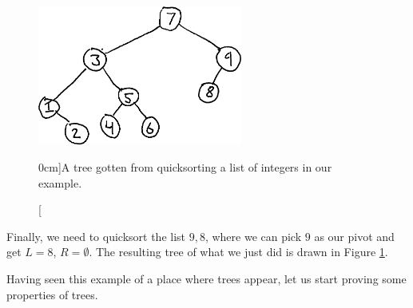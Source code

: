\documentclass[nobib]{tufte-handout}
\begin{document}
\begin{example}
  \begin{figure}
    \centering
    \includegraphics[width=0.6\textwidth]{graphics/L3_trees/quicksort_tree.png}
    \caption[][0cm]{A tree gotten from quicksorting a list of integers in our example.}
    \label{fig:quicksort_tree}
  \end{figure}

  Finally, we need to quicksort the list $9,8$, where we can pick $9$ as our pivot and get $L = 8$, $R = \emptyset$. The resulting tree of what we just did is drawn in Figure \ref{fig:quicksort_tree}.
\end{example}

Having seen this example of a place where trees appear, let us start proving some properties of trees.
\end{document}

